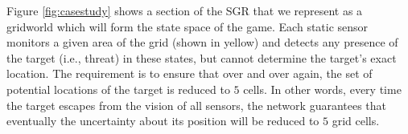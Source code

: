 Figure \ref{fig:casestudy} shows a section of the SGR that we represent as a gridworld which will form the state space of the game. Each static sensor monitors a given area of the grid (shown in yellow) and detects any presence of the target (i.e., threat) in these states, but cannot determine the target's exact location. The  requirement is to ensure that over and over again, the set of potential locations of the target is reduced to $5$ cells. In other words, every time the target escapes from the vision of all  sensors, the network guarantees that eventually the uncertainty about its position will be reduced to $5$ grid cells.


